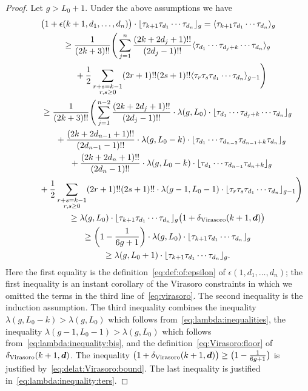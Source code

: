 \begin{proof}
Let $g> L_0+1$. Under the above assumptions we have
\begin{gather*}
\big(1+\epsilon(k+1,d_1,\dots,d_n)\big)\cdot\lfloor\tau_{k+1}\tau_{d_1}\cdots\tau_{d_n}\rfloor_g
=\langle\tau_{k+1}\tau_{d_1}\cdots\tau_{d_n}\rangle_g
 \\
 \qquad{} \ge
\frac{1}{(2k+3)!!}
\Bigg(\sum_{j=1}^n
\frac{(2k+2d_j+1)!!}{(2d_j-1)!!}\langle\tau_{d_1}\cdots
\tau_{d_{j}+k}\cdots\tau_{d_n}\rangle_g\\
\qquad\quad{} +\frac{1}{2}\sum_{\substack{r+s=k-1\\r,s\ge 0}}
(2r+1)!!(2s+1)!!\langle\tau_r\tau_s\tau_{d_1}\cdots\tau_{d_n}\rangle_{g-1}
\Bigg)
\\ \qquad{} \ge
\frac{1}{(2k+3)!!}
\Bigg(\sum_{j=1}^{n-2}
\frac{(2k+2d_j+1)!!}{(2d_j-1)!!}
\cdot\lambda(g,L_0)\cdot
\lfloor\tau_{d_1}\cdots
\tau_{d_{j}+k}\cdots\tau_{d_n}\rfloor_g
\\
\qquad\quad {}+\frac{(2k+2d_{n-1}+1)!!}{(2d_{n-1}-1)!!}
\cdot\lambda(g,L_0-k)\cdot
\lfloor\tau_{d_1}\cdots\tau_{d_{n-2}}
\tau_{d_{n-1}+k}\tau_{d_n}\rfloor_g
\\
\qquad\quad {}+\frac{(2k+2d_{n}+1)!!}{(2d_{n}-1)!!}
\cdot\lambda(g,L_0-k)\cdot
\lfloor\tau_{d_1}\cdots\tau_{d_{n-1}}
\tau_{d_{n}+k}\rfloor_g
\\
\qquad\quad {}+\frac{1}{2}\sum_{\substack{r+s=k-1\\r,s\ge 0}}
(2r+1)!!(2s+1)!!
\cdot\lambda(g-1,L_0-1)\cdot
\lfloor\tau_r\tau_s\tau_{d_1}\cdots\tau_{d_n}\rfloor_{g-1}
\Bigg)
\\
\qquad{} \ge\lambda(g,L_0)\cdot\lfloor\tau_{k+1}\tau_{d_1}\cdots\tau_{d_n}\rfloor_g
\big(1+\delta_{\rm Virasoro}(k+1,\boldsymbol{d})\big)
\\
\qquad{} \ge\left(1-\frac{1}{6g+1}\right)\cdot\lambda(g,L_0)\cdot\lfloor\tau_{k+1}\tau_{d_1}\cdots\tau_{d_n}\rfloor_g
\\
\qquad{} \ge\lambda(g,L_0+1)\cdot\lfloor\tau_{k+1}\tau_{d_1}\cdots\tau_{d_n}\rfloor_g .
\end{gather*}
Here the first equality is
the definition~\eqref{eq:def:of:epsilon}
of $\epsilon(1,d_1,\dots,d_n)$;
the first inequality
is an instant corollary of the
Virasoro constraints in which we omitted
the terms in the third line of~\eqref{eq:virasoro}.
The second inequality is the induction assumption.
The third inequality combines
the inequality $\lambda(g,L_0-k)>\lambda(g,L_0)$
which follows from~\eqref{eq:lambda:inequalities},
the inequality $\lambda(g-1,L_0-1)>\lambda(g,L_0)$
which follows from~\eqref{eq:lambda:inequality:bis},
and the definition~\eqref{eq:Virasoro:floor}
of $\delta_{\rm Virasoro}(k+1,\boldsymbol{d})$.
The inequality
$\big(1+\delta_{\rm Virasoro}(k+1,\boldsymbol{d})\big)\ge
\big(1-\frac{1}{6g+1}\big)$ is justified by~\eqref{eq:delat:Virasoro:bound}.
The last inequality is justified in~\eqref{eq:lambda:inequality:ters}.


\end{proof}
